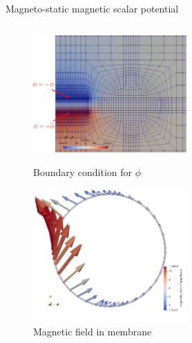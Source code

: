 \documentclass{beamer}
\begin{document}
\begin{frame}{Magneto-static magnetic scalar potential}
{\begin{columns}
\begin{column}{0.49\textwidth}
\begin{figure}[h]
\centering
\includegraphics[width=0.6\textwidth]{applied_mag_pot_magnet.pdf}
\caption{Boundary condition for $\phi$}
\vspace{0.1cm}
\centering
\includegraphics[width=0.6\textwidth]{x_p.png}
\caption{Magnetic field in membrane}
\end{figure}
\end{column}
\begin{column}{0.49\textwidth}
\begin{figure}[h]
\centering

\end{figure}
\end{column}
\end{columns}}
\end{frame}
\end{document}

